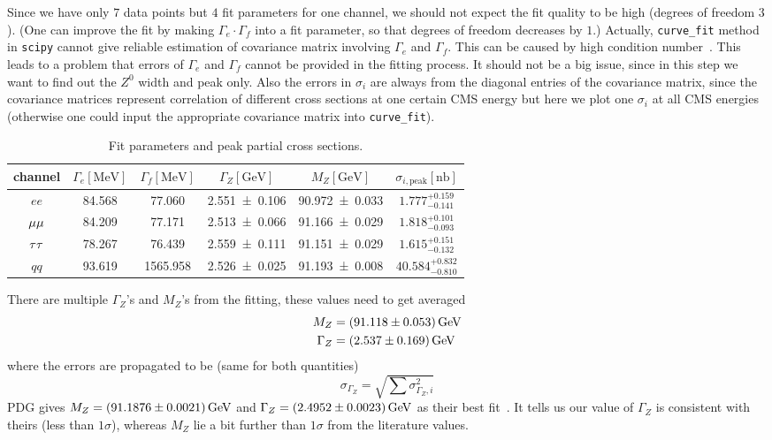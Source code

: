 Since we have only $7$ data points but $4$ fit parameters for one channel, we should not expect the fit quality to be high (degrees of freedom $3$). (One can improve the fit by making $\Gamma_e \cdot \Gamma_f$ into a fit parameter, so that degrees of freedom decreases by $1$.) Actually, \verb|curve_fit| method in \verb|scipy| cannot give reliable estimation of covariance matrix involving $\Gamma_e$ and $\Gamma_f$. This can be caused by high condition number~\cite{stackoverflow}. This leads to a problem that errors of $\Gamma_e$ and $\Gamma_f$ cannot be provided in the fitting process. It should not be a big issue, since in this step we want to find out the $Z^0$ width and peak only. Also the errors in $\sigma_i$ are always from the diagonal entries of the covariance matrix, since the covariance matrices represent correlation of different cross sections at one certain CMS energy but here we plot one $\sigma_i$ at all CMS energies (otherwise one could input the appropriate covariance matrix into \verb|curve_fit|).

\begin{table}[ht]
\renewcommand{\arraystretch}{1.5}
	\centering
	\label{tab:label}
	\begin{tabular}{c | ccccc}
		\toprule
		channel & $\Gamma_e[\si{\mega\eV}]$ & $\Gamma_f[\si{\mega\eV}]$ & $\Gamma_Z[\si{\giga\eV}]$ & $M_Z[\si{\giga\eV}]$ & $\sigma_{i, \text{peak}}[\si{\nano\barn}]$\\
		\midrule 
		$ee$ & \num{84.568} & \num{77.060} & \num{2.551 +- 0.106} & \num{90.972 +- 0.033} & $1.777^{+0.159}_{-0.141}$\\
		$\mu\mu$ & \num{84.209} & \num{77.171} & \num{2.513 +- 0.066} & \num{91.166 +- 0.029} & $1.818^{+0.101}_{-0.093}$\\
		$\tau\tau$ & \num{78.267} & \num{76.439} & \num{2.559 +- 0.111} & \num{91.151 +- 0.029} & $1.615^{+0.151}_{-0.132}$ \\
		$qq$ & \num{93.619} & \num{1565.958} & \num{2.526 +- 0.025} & \num{91.193 +- 0.008} & $40.584^{+0.832}_{-0.810}$\\
		\bottomrule
	\end{tabular}
	\caption{Fit parameters and peak partial cross sections.}
\end{table}

There are multiple $\Gamma_Z$'s and $M_Z$'s from the fitting, these values need to get averaged
\begin{align}
	M_Z &= \SI{91.118 +- 0.053}{\giga\eV} \\
	\Gamma_Z &= \SI{2.537 +- 0.169}{\giga\eV}
\end{align}
where the errors are propagated to be (same for both quantities)
\begin{equation*}
	\sigma_{\Gamma_Z} = \sqrt{\sum \sigma_{\Gamma_{Z}, i}^2}
\end{equation*}
PDG gives $M_Z = \SI{91.1876 +- 0.0021}{\giga\eV}$ and $\Gamma_Z = \SI{2.4952 +- 0.0023}{\giga\eV}$ as their best fit~\cite{PDG}. It tells us our value of $\Gamma_Z$ is consistent with theirs (less than $1\sigma$), whereas $M_Z$ lie a bit further than $1\sigma$ from the literature values.


